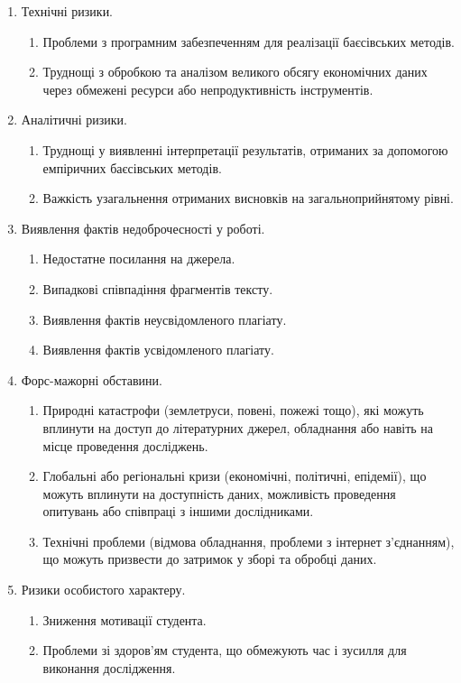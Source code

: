 \documentclass{mathreport}
\begin{document}
\begin{enumerate}[label=R\arabic*.]
    \item Технічні ризики.
    \begin{enumerate}[label=R\arabic{enumi}.\arabic{enumii}]
        \item Проблеми з програмним забезпеченням для реалізації баєсівських методів.
        \item Труднощі з обробкою та аналізом великого обсягу економічних даних через обмежені ресурси або непродуктивність інструментів.
    \end{enumerate}
    \item Аналітичні ризики.
    \begin{enumerate}[label=R\arabic{enumi}.\arabic{enumii}]
        \item Труднощі у виявленні інтерпретації результатів, отриманих за допомогою емпіричних баєсівських методів.
        \item Важкість узагальнення отриманих висновків на загальноприйнятому рівні.
    \end{enumerate}
    \item Виявлення фактів недоброчесності у роботі.
    \begin{enumerate}[label=R\arabic{enumi}.\arabic{enumii}]
        \item Недостатне посилання на джерела.
        \item Випадкові співпадіння фрагментів тексту.
        \item Виявлення фактів неусвідомленого плагіату.
        \item Виявлення фактів усвідомленого плагіату.
    \end{enumerate}
    \item Форс-мажорні обставини.
    \begin{enumerate}[label=R\arabic{enumi}.\arabic{enumii}]
        \item Природні катастрофи (землетруси, повені, пожежі тощо), які можуть вплинути на доступ до літературних джерел, обладнання або навіть на місце проведення досліджень.
        \item Глобальні або регіональні кризи (економічні, політичні, епідемії), що можуть вплинути на доступність даних, можливість проведення опитувань або співпраці з іншими дослідниками.
        \item Технічні проблеми (відмова обладнання, проблеми з інтернет з'єднанням), що можуть призвести до затримок у зборі та обробці даних.
    \end{enumerate}
    \item Ризики особистого характеру.
    \begin{enumerate}[label=R\arabic{enumi}.\arabic{enumii}]
        \item Зниження мотивації студента.
        \item Проблеми зі здоров’ям студента, що обмежують час і зусилля для виконання дослідження.
    \end{enumerate}
\end{enumerate}
\end{document}
